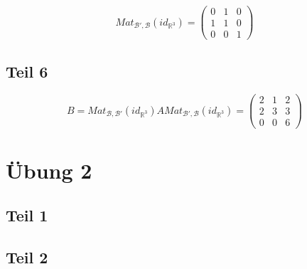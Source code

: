 \documentclass[a4paper,10pt]{article}
\begin{document}
\begin{equation}
 Mat_{\mathcal{B}',\mathcal{B}}(id_{\mathbb{R}^3}) =
  \begin{pmatrix}
   0 & 1 & 0\\
   1 & 1 & 0\\
   0 & 0 & 1
  \end{pmatrix}
\end{equation}

\subsection*{Teil 6}

\begin{equation}
 B = Mat_{\mathcal{B},\mathcal{B}'}(id_{\mathbb{R}^3})AMat_{\mathcal{B}',\mathcal{B}}(id_{\mathbb{R}^3}) = 
  \begin{pmatrix}
   2 & 1 & 2\\
   2 & 3 & 3\\
   0 & 0 & 6
  \end{pmatrix}
\end{equation}

\section*{Übung 2}

\subsection*{Teil 1}

\subsection*{Teil 2}
\end{document}
